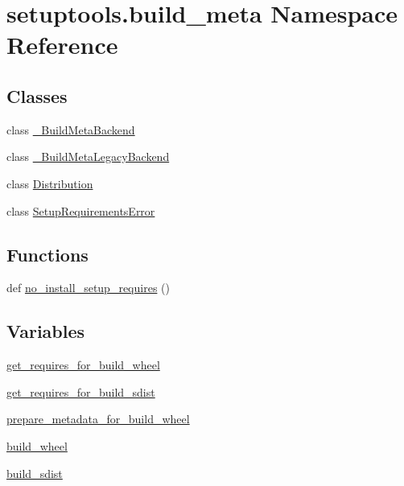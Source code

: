 \hypertarget{namespacesetuptools_1_1build__meta}{}\section{setuptools.\+build\+\_\+meta Namespace Reference}
\label{namespacesetuptools_1_1build__meta}
\subsection*{Classes}
\begin{DoxyCompactItemize}
\item 
class \hyperlink{classsetuptools_1_1build__meta_1_1__BuildMetaBackend}{\+\_\+\+Build\+Meta\+Backend}
\item 
class \hyperlink{classsetuptools_1_1build__meta_1_1__BuildMetaLegacyBackend}{\+\_\+\+Build\+Meta\+Legacy\+Backend}
\item 
class \hyperlink{classsetuptools_1_1build__meta_1_1Distribution}{Distribution}
\item 
class \hyperlink{classsetuptools_1_1build__meta_1_1SetupRequirementsError}{Setup\+Requirements\+Error}
\end{DoxyCompactItemize}
\subsection*{Functions}
\begin{DoxyCompactItemize}
\item 
def \hyperlink{namespacesetuptools_1_1build__meta_a2d613b8edde1bdbe5292f18b72d07c42}{no\+\_\+install\+\_\+setup\+\_\+requires} ()
\end{DoxyCompactItemize}
\subsection*{Variables}
\begin{DoxyCompactItemize}
\item 
\hyperlink{namespacesetuptools_1_1build__meta_ae422aa2677da3cdad5d9210ff4d3db6c}{get\+\_\+requires\+\_\+for\+\_\+build\+\_\+wheel}
\item 
\hyperlink{namespacesetuptools_1_1build__meta_afa6e72b6701024a70ba35eebabac86ff}{get\+\_\+requires\+\_\+for\+\_\+build\+\_\+sdist}
\item 
\hyperlink{namespacesetuptools_1_1build__meta_a3cdfc997ea294205c834e83b162da242}{prepare\+\_\+metadata\+\_\+for\+\_\+build\+\_\+wheel}
\item 
\hyperlink{namespacesetuptools_1_1build__meta_aa1e49d651c5d668b3cea0c55420626be}{build\+\_\+wheel}
\item 
\hyperlink{namespacesetuptools_1_1build__meta_a313c85d35645c296bbf0fee98cbcb0b8}{build\+\_\+sdist}
\end{DoxyCompactItemize}


